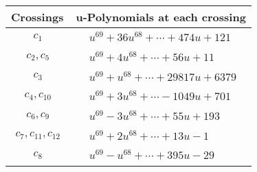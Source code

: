 \documentclass[1p]{elsarticle_modified}
\theoremstyle{definition}
\begin{document}
\begin{tabular}{m{50pt}|m{274pt}}
Crossings & \hspace{64pt}u-Polynomials at each crossing \\
\hline $$\begin{aligned}c_{1}\end{aligned}$$&$\begin{aligned}
&u^{69}+36 u^{68}+\cdots+474 u+121
\end{aligned}$\\
\hline $$\begin{aligned}c_{2},c_{5}\end{aligned}$$&$\begin{aligned}
&u^{69}+4 u^{68}+\cdots+56 u+11
\end{aligned}$\\
\hline $$\begin{aligned}c_{3}\end{aligned}$$&$\begin{aligned}
&u^{69}+u^{68}+\cdots+29817 u+6379
\end{aligned}$\\
\hline $$\begin{aligned}c_{4},c_{10}\end{aligned}$$&$\begin{aligned}
&u^{69}+3 u^{68}+\cdots-1049 u+701
\end{aligned}$\\
\hline $$\begin{aligned}c_{6},c_{9}\end{aligned}$$&$\begin{aligned}
&u^{69}-3 u^{68}+\cdots+55 u+193
\end{aligned}$\\
\hline $$\begin{aligned}c_{7},c_{11},c_{12}\end{aligned}$$&$\begin{aligned}
&u^{69}+2 u^{68}+\cdots+13 u-1
\end{aligned}$\\
\hline $$\begin{aligned}c_{8}\end{aligned}$$&$\begin{aligned}
&u^{69}- u^{68}+\cdots+395 u-29
\end{aligned}$\\
\hline
\end{tabular}\\~\\
\newpage\renewcommand{\arraystretch}{1}
\end{document}
